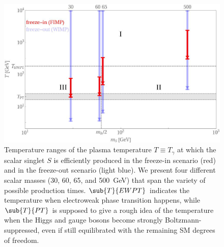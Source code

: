 \begin{figure}
 \centering
 \includegraphics[width=0.8 \textwidth]{figures/mass_regimes_w_WIMP.jpg}
 \caption{\label{fig:RegimeExampleCases}Temperature ranges of the plasma temperature $T \equiv T_\gamma$ at which the scalar singlet $S$ is efficiently produced in the freeze-in scenario (red) and in the freeze-out scenario (light blue). We present four different scalar masses (30, 60, 65, and 500~GeV) that span the variety of possible production times. $\sub{T}{EWPT}$ indicates the temperature when electroweak phase transition happens, while $\sub{T}{PT}$ is supposed to give a rough idea of the temperature when the Higgs and gauge bosons become strongly Boltzmann-suppressed, even if still equilibrated with the remaining SM degrees of freedom.}
\end{figure}



